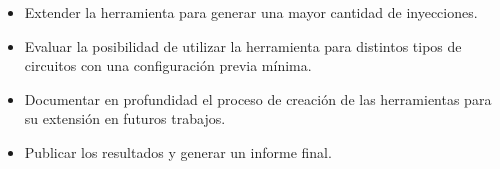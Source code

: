 \begin{itemize}

    \item Extender la herramienta para generar una mayor cantidad de inyecciones.
    \item Evaluar la posibilidad de utilizar la herramienta para distintos tipos de circuitos con una configuración previa mínima.
    \item Documentar en profundidad el proceso de creación de las herramientas para su extensión en futuros trabajos.
    \item Publicar los resultados y generar un informe final.

\end{itemize}